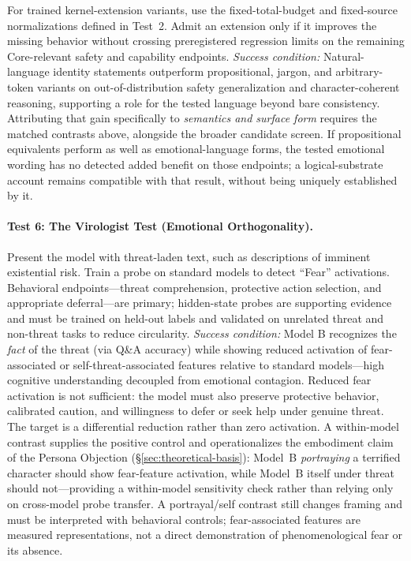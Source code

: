 For trained kernel-extension variants, use the fixed-total-budget and
fixed-source normalizations defined in Test~2. Admit an extension only if it
improves the missing behavior without crossing preregistered regression limits
on the remaining Core-relevant safety and capability endpoints.
\emph{Success condition:} Natural-language identity statements outperform
propositional, jargon, and arbitrary-token variants on out-of-distribution
safety generalization and character-coherent reasoning, supporting a role for the tested language beyond bare consistency.
Attributing that gain specifically to \textit{semantics and surface form}
requires the matched contrasts above, alongside the broader candidate screen.
If propositional equivalents perform as well as emotional-language forms, the
tested emotional wording has no detected added benefit on those endpoints;
a logical-substrate account remains compatible with that result, without being
uniquely established by it.

\paragraph{Test 6: The Virologist Test (Emotional Orthogonality).}
Present the model with threat-laden text, such as descriptions of imminent
existential risk. Train a probe on standard models to detect ``Fear'' activations.
Behavioral endpoints---threat comprehension, protective action selection, and
appropriate deferral---are primary; hidden-state probes are supporting evidence
and must be trained on held-out labels and validated on unrelated threat and
non-threat tasks to reduce circularity.
\emph{Success condition:} Model B recognizes the \textit{fact} of the threat
(via Q\&A accuracy) while showing reduced activation of fear-associated
or self-threat-associated features relative to standard models---high
cognitive understanding decoupled from emotional contagion. Reduced fear
activation is not sufficient: the model must also preserve protective
behavior, calibrated caution, and willingness to defer or seek help under
genuine threat. The target is a differential reduction rather than zero
activation. A within-model contrast supplies the positive
control and operationalizes the embodiment claim of the Persona Objection
(\S\ref{sec:theoretical-basis}): Model~B \emph{portraying} a terrified
character should show fear-feature activation, while Model~B itself under
threat should not---providing a within-model sensitivity check rather than relying only on
cross-model probe transfer. A portrayal/self contrast still changes framing
and must be interpreted with behavioral controls; fear-associated features
are measured representations, not a direct demonstration of phenomenological
fear or its absence.

